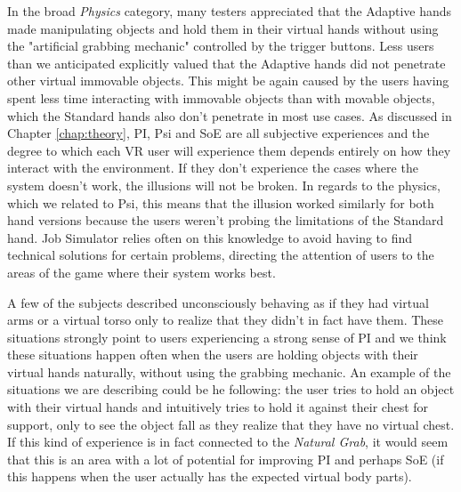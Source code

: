 In the broad \textit{Physics} category, many testers appreciated that the Adaptive hands made manipulating objects and hold them in their virtual hands without using the "artificial grabbing mechanic" controlled by the trigger buttons. Less users than we anticipated explicitly valued that the Adaptive hands did not penetrate other virtual immovable objects. This might be again caused by the users having spent less time interacting with immovable objects than with movable objects, which the Standard hands also don't penetrate in most use cases. As discussed in Chapter \ref{chap:theory}, PI, Psi and SoE are all subjective experiences and the degree to which each VR user will experience them depends entirely on how they interact with the environment. If they don't experience the cases where the system doesn't work, the illusions will not be broken. In regards to the physics, which we related to Psi, this means that the illusion worked similarly for both hand versions because the users weren't probing the limitations of the Standard hand. Job Simulator relies often on this knowledge to avoid having to find technical solutions for certain problems, directing the attention of users to the areas of the game where their system works best.

A few of the subjects described unconsciously behaving as if they had virtual arms or a virtual torso only to realize that they didn't in fact have them. These situations strongly point to users experiencing a strong sense of PI and we think these situations happen often when the users are holding objects with their virtual hands naturally, without using the grabbing mechanic. An example of the situations we are describing could be he following: the user tries to hold an object with their virtual hands and intuitively tries to hold it against their chest for support, only to see the object fall as they realize that they have no virtual chest. If this kind of experience is in fact connected to the \textit{Natural Grab}, it would seem that this is an area with a lot of potential for improving PI and perhaps SoE (if this happens when the user actually has the expected virtual body parts).


